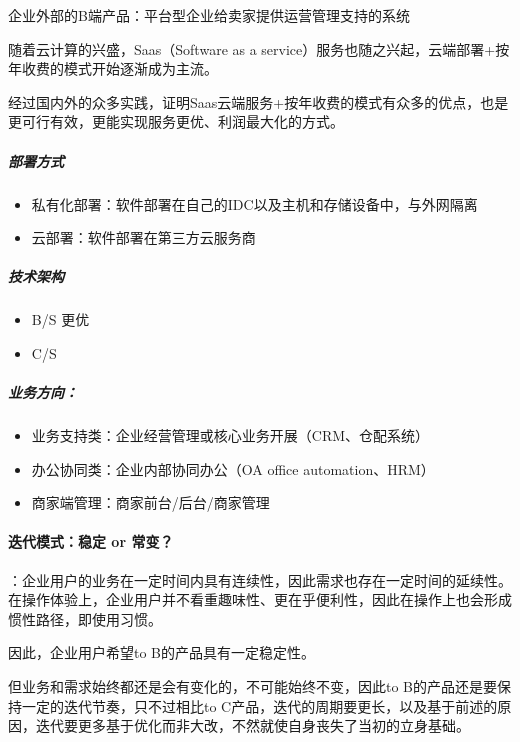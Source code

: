 \documentclass[letterpaper,10pt,english]{sphinxmanual}
\begin{document}
企业外部的B端产品：平台型企业给卖家提供运营管理支持的系统

随着云计算的兴盛，Saas（Software as a
service）服务也随之兴起，云端部署+按年收费的模式开始逐渐成为主流。

经过国内外的众多实践，证明Saas云端服务+按年收费的模式有众多的优点，也是更可行有效，更能实现服务更优、利润最大化的方式。


\subparagraph{部署方式}
\label{\detokenize{chapter_introduction/2B:id10}}\begin{itemize}
\item {} 
私有化部署：软件部署在自己的IDC以及主机和存储设备中，与外网隔离

\item {} 
云部署：软件部署在第三方云服务商

\end{itemize}


\subparagraph{技术架构}
\label{\detokenize{chapter_introduction/2B:id11}}\begin{itemize}
\item {} 
B/S 更优

\item {} 
C/S

\end{itemize}


\subparagraph{业务方向：}
\label{\detokenize{chapter_introduction/2B:id12}}\begin{itemize}
\item {} 
业务支持类：企业经营管理或核心业务开展（CRM、仓配系统）

\item {} 
办公协同类：企业内部协同办公（OA office automation、HRM）

\item {} 
商家端管理：商家前台/后台/商家管理

\end{itemize}


\paragraph{迭代模式：稳定 or 常变？}
\label{\detokenize{chapter_introduction/2B:or}}
：企业用户的业务在一定时间内具有连续性，因此需求也存在一定时间的延续性。在操作体验上，企业用户并不看重趣味性、更在乎便利性，因此在操作上也会形成惯性路径，即使用习惯。

因此，企业用户希望to B的产品具有一定稳定性。

但业务和需求始终都还是会有变化的，不可能始终不变，因此to
B的产品还是要保持一定的迭代节奏，只不过相比to
C产品，迭代的周期要更长，以及基于前述的原因，迭代要更多基于优化而非大改，不然就使自身丧失了当初的立身基础。
\end{document}
